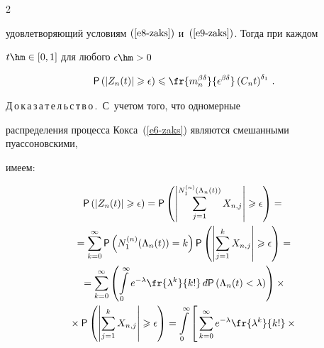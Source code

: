 \begin{multicols}{2}
{удовлетворяющий условиям $(\ref{e8-zaks})$ и~$(\ref{e9-zaks})$. Тогда при каждом

$t\hm\in[0,1]$ для любого $\epsilon\hm>0$}

$$

{\sf P}\left(|Z_n(t)|\geqslant\epsilon\right)\leqslant

\fr{m_n^{\beta\delta}}{\epsilon^{\beta\delta}} \left(C_nt\right)^{\delta_1}\,.

$$



\smallskip



\noindent

Д\,о\,к\,а\,з\,а\,т\,е\,л\,ь\,с\,т\,в\,о\,.\ С~учетом того, что одномерные

распределения процесса Кокса~(\ref{e6-zaks}) являются смешанными пуассоновскими,

имеем:

\begin{multline}

{\sf P}\left(|Z_n(t)|\geqslant\epsilon\right)=

{\sf P}\left(\left|\sum\limits_{j=1}^{N^{(n)}_1(\Lambda_n(t))}X_{n,j}\right|\geqslant\epsilon\right)={}\\

{}=

\sum\limits_{k=0}^{\infty}{\sf P}\left(N^{(n)}_1(\Lambda_n(t))=k\right){\sf

P}\left(\left\vert\sum\limits_{j=1}^kX_{n,j}\right\vert \geqslant\epsilon\right)={}

\\

{}=\sum\limits_{k=0}^{\infty}\left(\int\limits_{0}^{\infty}

e^{-\lambda}\fr{\lambda^k}{k!}\,d {\sf P}\left(\Lambda_n(t)<\lambda\right)\right)\times{}\\

{}\times{\sf P}

\left(\left\vert \sum\limits_{j=1}^kX_{n,j}\right\vert\geqslant\epsilon\right)=

\int\limits_{0}^{\infty}\left[

\vphantom{\left(\left\vert\sum\limits_{j=1}^kX_{n,j}\right\vert

\geqslant\epsilon\right)}

\sum\limits_{k=0}^{\infty}e^{-\lambda}\fr{\lambda^k}{k!}

\times{}\right.\\


\end{multline}
\end{multicols}
